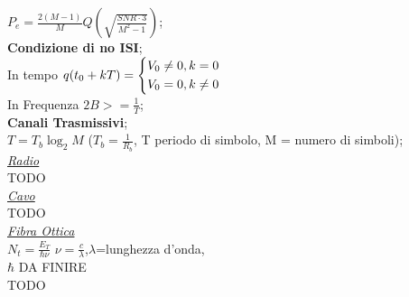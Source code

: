 \documentclass[a4paper]{article}
\begin{document}
\begin{multicols*}{3}
$P_e = \frac{2(M-1)}{M}Q(\sqrt{\frac{SNR \cdot 3}{M^2-1}})$; \\
\textbf{Condizione di no ISI}; \\
In tempo
 $ q(t_{0}+kT)=
\begin{dcases}
    V_0\ne0 , k=0  \\
    V_0=0, k\ne0  \\
\end{dcases}
$ \\
In Frequenza
$2B >= \frac{1}{T}$; \\
\textbf{Canali Trasmissivi}; \\
$T=T_b \log_{2}{M}$ ($T_b = \frac{1}{R_b}$, T periodo di simbolo,
M = numero di simboli);\\
\underline{\textit{Radio}} \\
TODO \\
\underline{\textit{Cavo}} \\
TODO \\
\underline{\textit{Fibra Ottica}} \\
$N_t=\frac{E_T}{\hbar\nu}$ $\nu =\frac{c}{\lambda}$,$\lambda$=lunghezza d'onda,
\\ $\hbar$ DA FINIRE \\
TODO \\
\end{multicols*}
\end{document}
